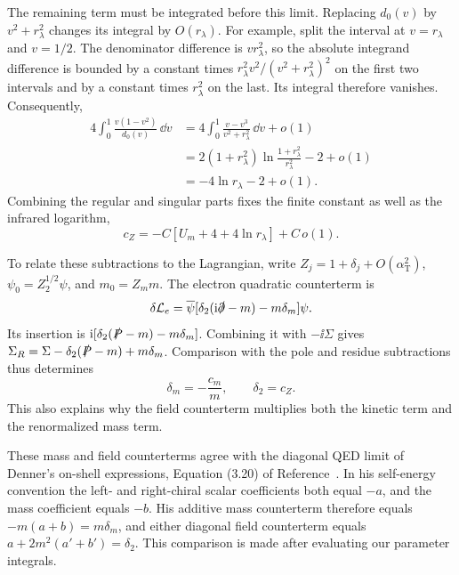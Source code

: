 The remaining term must be integrated before this limit. Replacing
$d_0(v)$ by $v^2+r_\lambda^2$ changes its integral by $O(r_\lambda)$.
For example, split the interval at $v=r_\lambda$ and $v=1/2$.
The denominator difference is $v r_\lambda^2$, so the absolute
integrand difference is bounded by a constant times
$r_\lambda^2v^2/(v^2+r_\lambda^2)^2$ on the first two intervals
and by a constant times $r_\lambda^2$ on the last. Its integral
therefore vanishes. Consequently,
\begin{align}
 4\int_0^1\frac{v(1-v^2)}{d_0(v)}\,\dd v
 &=4\int_0^1\frac{v-v^3}{v^2+r_\lambda^2}\,\dd v+o(1)\\
 &=2(1+r_\lambda^2)\ln\frac{1+r_\lambda^2}{r_\lambda^2}-2+o(1)\\
 &=-4\ln r_\lambda-2+o(1).
\end{align}
Combining the regular and singular parts fixes the finite constant
as well as the infrared logarithm,
\begin{equation}
 c_Z=-C[U_m+4+4\ln r_\lambda]+C\,o(1).
\end{equation}

To relate these subtractions to the Lagrangian, write
$Z_j=1+\delta_j+O(\alpha_{\mathrm T}^2)$,
$\psi_0=Z_2^{1/2}\psi$, and $m_0=Z_m m$. The electron quadratic
counterterm is
\begin{equation}
 \delta\mathcal L_e=
 \overline\psi[\delta_2(\mathrm{i}\slashed\partial-m)-m\delta_m]\psi.
\end{equation}
Its insertion is $\mathrm{i}[\delta_2(\slashed P-m)-m\delta_m]$.
Combining it with $-\ii\Sigma$ gives
$\Sigma_R=\Sigma-\delta_2(\slashed P-m)+m\delta_m$.
Comparison with the pole and residue subtractions thus determines
\begin{equation}
 \delta_m=-\frac{c_m}{m},\qquad \delta_2=c_Z.
\end{equation}
This also explains why the field counterterm multiplies both the
kinetic term and the renormalized mass term.

These mass and field counterterms agree with the diagonal QED limit
of Denner's on-shell expressions, Equation (3.20) of
Reference~\cite{compton-overview-denner-renormalization}.
In his self-energy convention the left- and right-chiral scalar
coefficients both equal $-a$, and the mass coefficient equals $-b$.
His additive mass counterterm therefore equals $-m(a+b)=m\delta_m$,
and either diagonal field counterterm equals
$a+2m^2(a'+b')=\delta_2$. This comparison is made after evaluating
our parameter integrals.


